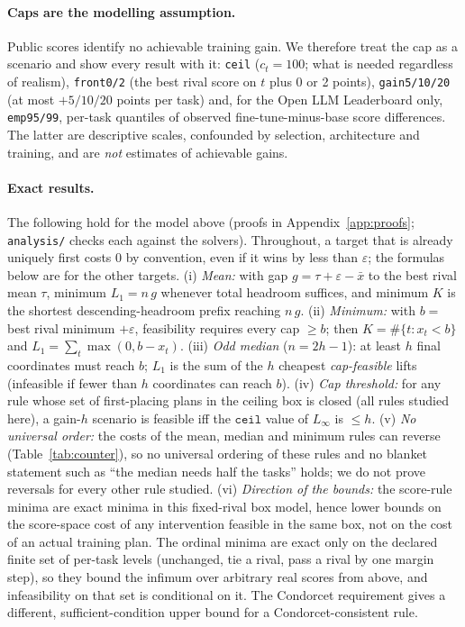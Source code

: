 \paragraph{Caps are the modelling assumption.}
Public scores identify no achievable training gain. We therefore treat the cap as a scenario and show every result with it: \texttt{ceil} ($c_t=100$; what is needed regardless of realism), \texttt{front0/2} (the best rival score on $t$ plus 0 or 2 points), \texttt{gain5/10/20} (at most $+5/10/20$ points per task) and, for the Open LLM Leaderboard only, \texttt{emp95/99}, per-task quantiles of observed fine-tune-minus-base score differences. The latter are descriptive scales, confounded by selection, architecture and training, and are \emph{not} estimates of achievable gains.

\paragraph{Exact results.}
The following hold for the model above (proofs in Appendix~\ref{app:proofs}; \texttt{analysis/} checks each against the solvers). Throughout, a target that is already uniquely first costs 0 by convention, even if it wins by less than $\varepsilon$; the formulas below are for the other targets. (i) \emph{Mean:} with gap $g=\tau+\varepsilon-\bar x$ to the best rival mean $\tau$, minimum $L_1=n\,g$ whenever total headroom suffices, and minimum $K$ is the shortest descending-headroom prefix reaching $n\,g$. (ii) \emph{Minimum:} with $b=$ best rival minimum $+\varepsilon$, feasibility requires every cap $\ge b$; then $K=\#\{t:x_t<b\}$ and $L_1=\sum_t\max(0,b-x_t)$. (iii) \emph{Odd median} ($n=2h-1$): at least $h$ final coordinates must reach $b$; $L_1$ is the sum of the $h$ cheapest \emph{cap-feasible} lifts (infeasible if fewer than $h$ coordinates can reach $b$). (iv) \emph{Cap threshold:} for any rule whose set of first-placing plans in the ceiling box is closed (all rules studied here), a gain-$h$ scenario is feasible iff the $\texttt{ceil}$ value of $L_\infty$ is $\le h$. (v) \emph{No universal order:} the costs of the mean, median and minimum rules can reverse (Table~\ref{tab:counter}), so no universal ordering of these rules and no blanket statement such as ``the median needs half the tasks'' holds; we do not prove reversals for every other rule studied. (vi) \emph{Direction of the bounds:} the score-rule minima are exact minima in this fixed-rival box model, hence lower bounds on the score-space cost of any intervention feasible in the same box, not on the cost of an actual training plan. The ordinal minima are exact only on the declared finite set of per-task levels (unchanged, tie a rival, pass a rival by one margin step), so they bound the infimum over arbitrary real scores from above, and infeasibility on that set is conditional on it. The Condorcet requirement gives a different, sufficient-condition upper bound for a Condorcet-consistent rule.

